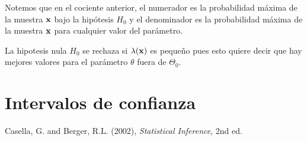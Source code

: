 \documentclass[14pt]{extarticle}
\begin{document}
Notemos que en el cociente anterior, el numerador es la probabilidad máxima de la muestra $\bold{x}$ bajo la hipótesis $H_0$ y el 
denominador es la probabilidad máxima de la muestra $\bold{x}$ para cualquier valor del parámetro.

La hipotesis nula $H_0$ se rechaza si $\lambda(\bold{x})$ es pequeño pues esto quiere decir que hay mejores valores para el parámetro $\theta$
fuera de $\Theta_0$.




\section{Intervalos de confianza}

\begin{thebibliography}{9}
        Casella, G. and Berger, R.L. (2002), \textit{Statistical Inference}, 2nd ed.
\end{thebibliography}
\end{document}
